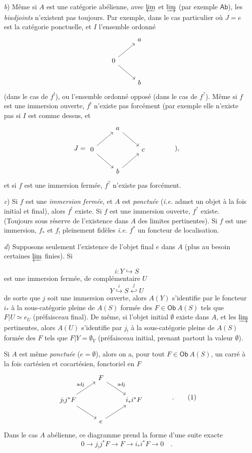 \documentclass[11pt]{article}
\newcommand{\printedpage}[1]{\marginpar{\footnotesize p.~#1}}
\newcommand{\msp}[1]{\marginpar{\footnotesize [#1]}}
\newcommand{\Ob}{\mathsf{Ob}}
\newcommand{\Ab}{\mathsf{Ab}}
\begin{document}
\textit{b}) Même si $A$ est une catégorie abélienne, avec $\varprojlim$ et $\varinjlim$ (par exemple $\Ab$), les \textit{biadjoints} n'existent pas toujours. Par exemple, dans le cas particulier où $J=e$ est la catégorie ponctuelle, et $I$ l'ensemble ordonné
\[
\begin{tikzcd}
 & a \\
0 \arrow[ur] \arrow[dr] & \\
 & b
\end{tikzcd}
\]
(dans le cas de $f^{!}$), ou l'ensemble ordonné opposé (dans le cas de $f^{?}$). Même si $f$ est une immersion ouverte, $f^{!}$ n'existe pas forcément (par exemple elle n'existe pas si $I$ est comme dessus, et
\[
J=\begin{tikzcd}
 & a \arrow[dr] & \\
0 \arrow[ur] \arrow[dr] & & c \\
 & b \arrow[ur] &
\end{tikzcd}
\qquad\qquad \text{),}
\]
et si $f$ est une immersion fermée, $f^{?}$ n'existe pas forcément.

\textit{c}) Si $f$ est une \textit{immersion fermée}, et $A$ est \textit{ponctuée} (\textit{i.e.} admet un objet à la fois initial et final), alors $f^{!}$ existe. Si $f$ est une immersion ouverte, $f^{?}$ existe. (Toujours sous réserve
\printedpage{2}
de l'existence dans $A$ des limites pertinentes). Si $f$ est une immersion, $f_{*}$ et $f_{!}$ pleinement fidèles \textit{i.e.} $f^{*}$ un foncteur de localisation.

\textit{d}) Supposons seulement l'existence de l'objet final $e$ dans $A$ (plus au besoin certaines $\varprojlim$ finies). Si

\msp{page 2}
\[
i : Y \hookrightarrow S
\]
est une immersion fermée, de complémentaire $U$
\[
Y \overset{i}{\hookrightarrow} S \overset{j}{\hookleftarrow} U
\]
de sorte que $j$ soit une immersion ouverte, alors $A(Y)$ s'identifie par le foncteur $i_{*}$ à la sous-catégorie pleine de $A(S)$ formée des $F \in \Ob\ A(S)$ tels que $F|U \simeq e_{U}$ (préfaisceau final). De même, si l'objet initial $\emptyset$ existe dans $A$, et les $\varinjlim$ pertinentes, alors $A(U)$ s'identifie par $j_{!}$ à la sous-catégorie pleine de $A(S)$ formée des $F$ tels que $F|Y=\emptyset_{Y}$ (préfaisceau initial, prenant partout la valeur $\emptyset$).

Si $A$ est même \textit{ponctuée} ($e=\emptyset$), alors on a, pour tout $F\in \Ob\ A(S)$, un carré à la fois cartésien et cocartésien, fonctoriel en $F$
\[
\begin{tikzcd}
 & F \arrow[dr, "\text{adj}"] & \\
j_{!}j^{*}F \arrow[ur, "\text{adj}"] \arrow[dr] & & i_{*}i^{*}F \\
 & e \arrow[ur] &
\end{tikzcd}
\qquad\qquad \text{.}
\tag*{(1)}
\]
Dans le cas $A$ abélienne, ce diagramme prend la forme d'une suite exacte
\[
0 \longrightarrow j_{!}j^{*}F \longrightarrow F \longrightarrow i_{*}i^{*}F \longrightarrow 0 \quad .
\]
\end{document}
